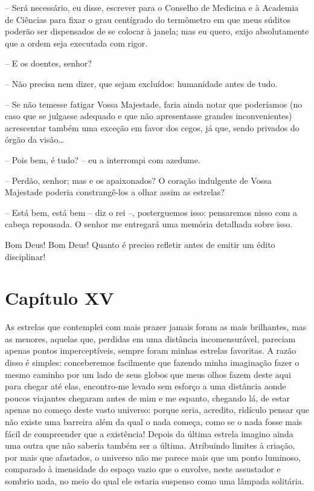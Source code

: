 -- Será necessário, eu disse, escrever para o Conselho de Medicina e à
Academia de Ciências para fixar o grau centígrado do termômetro em que
meus súditos poderão ser dispensados de se colocar à janela; mas eu
quero, exijo absolutamente que a ordem seja executada com rigor. 

-- E os doentes, senhor?

-- Não precisa nem dizer, que sejam excluídos: humanidade antes de
tudo. 

-- Se não temesse fatigar Vossa Majestade, faria ainda notar que
poderíamos (no caso que se julgasse adequado e que não apresentasse
grandes inconvenientes) acrescentar também uma exceção em favor dos
cegos, já que, sendo privados do órgão da visão\ldots

-- Pois bem, é tudo? -- eu a interrompi com azedume.

-- Perdão, senhor; mas e os apaixonados? O coração indulgente de Vossa
Majestade poderia constrangê-los a olhar assim as estrelas? 

-- Está bem, está bem -- diz o rei --, posterguemos isso: pensaremos nisso
com a cabeça repousada. O senhor me entregará uma memória detalhada sobre
isso.

Bom Deus! Bom Deus! Quanto é preciso refletir antes de emitir um édito
disciplinar!

\section*{Capítulo XV}

 As estrelas que contemplei com mais prazer jamais foram as mais
brilhantes, mas as menores, aquelas que, perdidas em uma distância
incomensurável, pareciam apenas pontos imperceptíveis, sempre foram
minhas estrelas favoritas. A razão disso é simples: conceberemos
facilmente que fazendo minha imaginação fazer o mesmo caminho por um
lado de seus globos que meus olhos fazem deste aqui para chegar até
elas, encontro-me levado sem esforço a uma distância aonde poucos
viajantes chegaram antes de mim e me espanto, chegando lá, de estar
apenas no começo deste vasto universo: porque seria, acredito, ridículo
pensar que não existe uma barreira além da qual o nada começa, como se
o nada fosse mais fácil de compreender que a existência! Depois da
última estrela imagino ainda uma outra que não saberia também ser a
última. Atribuindo limites à criação, por mais que afastados, o
universo não me parece mais que um ponto luminoso, comparado à
imensidade do espaço vazio que o envolve, neste assustador e sombrio
nada, no meio do qual ele estaria suspenso como uma lâmpada solitária.

